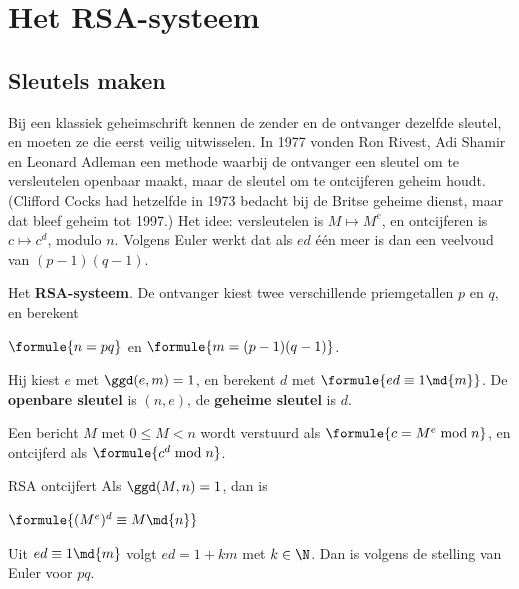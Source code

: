 \section{Het RSA-systeem}

\subsection{Sleutels maken}

Bij een klassiek geheimschrift kennen de zender en de ontvanger dezelfde sleutel, en moeten ze die eerst veilig uitwisselen. In 1977 vonden Ron Rivest, Adi Shamir en Leonard Adleman een methode waarbij de ontvanger een sleutel om te versleutelen openbaar maakt, maar de sleutel om te ontcijferen geheim houdt. (Clifford Cocks had hetzelfde in 1973 bedacht bij de Britse geheime dienst, maar dat bleef geheim tot 1997.) Het idee: versleutelen is $M \mapsto M^e$, en ontcijferen is $c \mapsto c^d$, modulo $n$. Volgens Euler werkt dat als $ed$ één meer is dan een veelvoud van $(p - 1)(q - 1)$.

\begin{theorie}
Het \textbf{\textcolor{accent}{RSA-systeem}}. De ontvanger kiest twee verschillende priemgetallen $p$ en $q$, en berekent

\vspace{1mm}
\qquad $\formule{n = pq}$ \qquad en \qquad $\formule{m = (p - 1)(q - 1)}$.

\vspace{1mm}
Hij kiest $e$ met $\ggd(e, m) = 1$, en berekent $d$ met $\formule{ed \equiv 1 \md{m}}$. De \textbf{\textcolor{accent}{openbare sleutel}} is $(n, e)$, de \textbf{\textcolor{accent}{geheime sleutel}} is $d$.

\vspace{1mm}
Een bericht $M$ met $0 \leqslant M < n$ wordt verstuurd als $\formule{c = M^e \bmod n}$, en ontcijferd als $\formule{c^d \bmod n}$.

\begin{stelling}{RSA ontcijfert}
Als $\ggd(M, n) = 1$, dan is

\vspace{1mm}
\qquad $\formule{(M^e)^d \equiv M \md{n}}$
\end{stelling}

\begin{bewijs}
Uit $ed \equiv 1 \md{m}$ volgt $ed = 1 + km$ met $k \in \N$. Dan is
volgens de stelling van Euler voor $pq$.
\end{bewijs}
\end{theorie}

